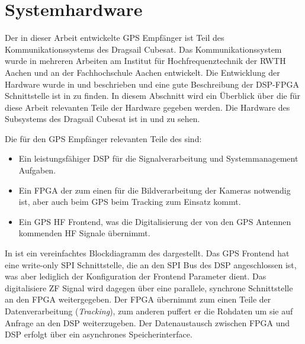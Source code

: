 \section{Systemhardware}
Der in dieser Arbeit entwickelte GPS Empfänger ist Teil des Kommunikationssystems des Dragsail Cubesat. Das Kommunikationssystem wurde in mehreren Arbeiten am Institut für Hochfrequenztechnik der RWTH Aachen und an der Fachhochschule Aachen entwickelt. Die Entwicklung der \comboard Hardware wurde in \cite{DragsailKaiMA} und \cite{DragsailMattiMA} beschrieben und eine gute Beschreibung der DSP-FPGA Schnittstelle ist in \cite{DragsailAndrejMA} zu finden.
In diesem Abschnitt wird ein Überblick über die für diese Arbeit relevanten Teile der \comboard Hardware gegeben werden. Die Hardware des \comboard Subsystems des Dragsail Cubesat ist in  und  zu sehen. 

Die für den GPS Empfänger relevanten Teile des \comboard sind: 
\begin{itemize}
\item Ein leistungsfähiger \gls{DSP} für die Signalverarbeitung und Systemmanagement Aufgaben.
\item Ein \gls{FPGA} der zum einen für die Bildverarbeitung der Kameras notwendig ist, aber auch beim GPS beim Tracking zum Einsatz kommt.
\item Ein GPS HF Frontend, was die Digitalisierung der von den GPS Antennen kommenden HF Signale übernimmt.
\end{itemize}



In  ist ein vereinfachtes Blockdiagramm des \comboard dargestellt. Das GPS Frontend hat eine write-only SPI Schnittstelle, die an den SPI Bus des DSP angeschlossen ist, was aber lediglich der Konfiguration der Frontend Parameter dient. Das digitalisiere \gls{ZF} Signal wird dagegen über eine parallele, synchrone Schnittstelle an den FPGA weitergegeben. Der FPGA übernimmt zum einen Teile der Datenverarbeitung (\emph{Tracking}), zum anderen puffert er die Rohdaten um sie auf Anfrage an den DSP weiterzugeben. Der Datenaustausch zwischen FPGA und DSP erfolgt über ein asynchrones Speicherinterface. 


